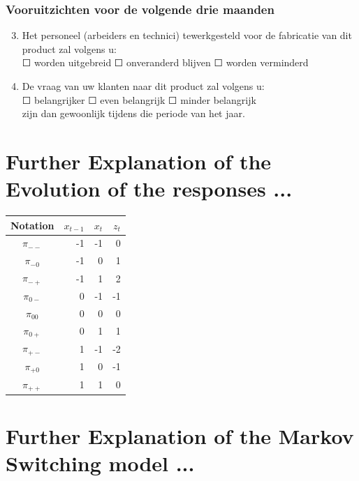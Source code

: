 \documentclass[12pt,a4paper,oneside]{book}
\begin{document}
\subsubsection*{Vooruitzichten voor de volgende drie maanden} 
\begin{enumerate}
\setcounter{enumi}{2}
    \item Het personeel (arbeiders en technici) tewerkgesteld voor de fabricatie van dit product zal volgens u: \\
	$\Square$ worden uitgebreid $\Square$ onveranderd blijven $\Square$ worden verminderd
						
    \item De vraag van uw klanten naar dit product zal volgens u:  \\
	$\Square$ belangrijker $\Square$ even belangrijk $\Square$ minder belangrijk \\	
	zijn dan gewoonlijk tijdens die periode van het jaar.
\end{enumerate}

\newpage

\section*{Further Explanation of the Evolution of the responses ...}
\begin{center}
\begin{tabular}{|c|r|r|r|}
Notation    &  $x_{t-1}$ & $x_t$ & $z_t$ \\\hline
$\pi_{--}$    &  -1  & -1    & 0 \\
$\pi_{-0}$    &  -1  & 0     & 1 \\
$\pi_{-+}$    &  -1  & 1     & 2 \\
$\pi_{0-}$    &  0   & -1    & -1 \\
$\pi_{00}$    &  0   & 0     & 0 \\
$\pi_{0+}$    &  0   & 1     & 1 \\
$\pi_{+-}$    &  1   & -1    & -2 \\
$\pi_{+0}$    &  1   & 0     & -1 \\
$\pi_{++}$    &  1   & 1     & 0 \\
\end{tabular}  
\end{center}

\newpage
\section*{Further Explanation of the Markov Switching model ...}
\end{document}
